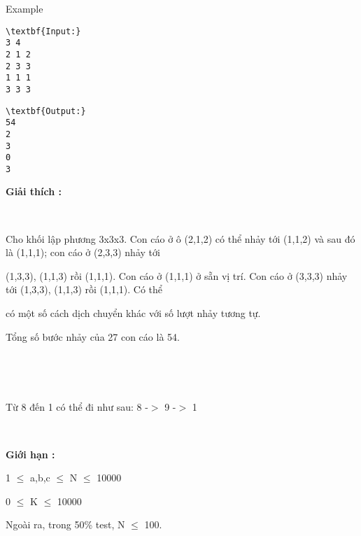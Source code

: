 Example
\begin{verbatim}
\textbf{Input:}
3 4
2 1 2
2 3 3
1 1 1
3 3 3\end{verbatim}
\begin{verbatim}
\textbf{Output:}
54
2
3
0
3\end{verbatim}

\textbf{Giải thích : }

 

Cho khối lập phương 3x3x3. Con cáo ở ô (2,1,2) có thể nhảy tới (1,1,2) và sau đó là (1,1,1); con cáo ở (2,3,3) nhảy tới

(1,3,3), (1,1,3) rồi (1,1,1). Con cáo ở (1,1,1) ở sẵn vị trí. Con cáo ở (3,3,3) nhảy tới (1,3,3), (1,1,3) rồi (1,1,1). Có thể

có một số cách dịch chuyển khác với số lượt nhảy tương tự.

Tổng số bước nhảy của 27 con cáo là 54.

 

 

Từ 8 đến 1 có thể đi như sau: 8 -$>$ 9 -$>$ 1

 

\textbf{Giới hạn : }

1 $\le$ a,b,c $\le$ N $\le$ 10000

0 $\le$ K $\le$ 10000

Ngoài ra, trong 50\% test, N $\le$ 100.